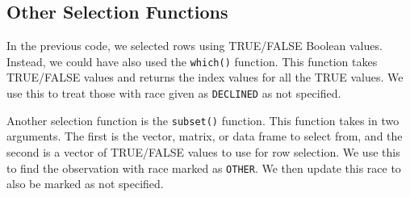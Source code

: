 \documentclass[
  letterpaper,
]{latex/krantz}
\makeatletter
\newenvironment{Shaded}{\begin{snugshade}}{\end{snugshade}}
\newcommand{\FunctionTok}[1]{\textcolor[rgb]{0.28,0.35,0.67}{#1}}
\newcommand{\NormalTok}[1]{\textcolor[rgb]{0.00,0.23,0.31}{#1}}
\newcommand{\OtherTok}[1]{\textcolor[rgb]{0.00,0.23,0.31}{#1}}
\newcommand{\SpecialCharTok}[1]{\textcolor[rgb]{0.37,0.37,0.37}{#1}}
\newcommand{\StringTok}[1]{\textcolor[rgb]{0.13,0.47,0.30}{#1}}
\newenvironment{kframe}{%
\medskip{}
\setlength{\fboxsep}{.8em}
 \def\at@end@of@kframe{}%
 \ifinner\ifhmode%
  \def\at@end@of@kframe{\end{minipage}}%
  \begin{minipage}{\columnwidth}%
 \fi\fi%
 \def\FrameCommand##1{\hskip\@totalleftmargin \hskip-\fboxsep
 \colorbox{shadecolor}{##1}\hskip-\fboxsep
     \hskip-\linewidth \hskip-\@totalleftmargin \hskip\columnwidth}%
 \MakeFramed {\advance\hsize-\width
   \@totalleftmargin\z@ \linewidth\hsize
   \@setminipage}}%
 {\par\unskip\endMakeFramed%
 \at@end@of@kframe}
\renewenvironment{Shaded}{\begin{kframe}}{\end{kframe}}
\makeatother
\begin{document}
\subsection{\texorpdfstring{Other Selection Functions
}{Other Selection Functions }}\label{other-selection-functions}

In the previous code, we selected rows using TRUE/FALSE Boolean values.
Instead, we could have also used the
\texttt{which()} function.
This function takes TRUE/FALSE values and returns the index values for
all the TRUE values. We use this to treat those with race given as
\texttt{DECLINED} as not specified.

\begin{Shaded}
\end{Shaded}

Another selection function is the
\texttt{subset()}
function. This function takes in two arguments. The first is the vector,
matrix, or data frame to select from, and the second is a vector of
TRUE/FALSE values to use for row selection. We use this to find the
observation with race marked as \texttt{OTHER}. We then update this race
to also be marked as not specified.
\end{document}
